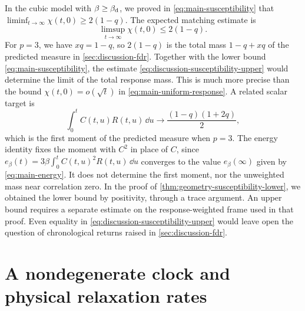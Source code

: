 In the cubic model with $\beta\ge\beta_{\mathrm d}$, we proved in \eqref{eq:main-susceptibility} that $\liminf_{t\to\infty}\chi(t,0)\ge2(1-q)$. The expected matching estimate is
\begin{equation}
 \limsup_{t\to\infty}\chi(t,0)\le2(1-q).
 \label{eq:discussion-susceptibility-upper}
\end{equation}
For $p=3$, we have $xq=1-q$, so $2(1-q)$ is the total mass $1-q+xq$ of the predicted measure in \cref{sec:discussion-fdr}. Together with the lower bound \eqref{eq:main-susceptibility}, the estimate \eqref{eq:discussion-susceptibility-upper} would determine the limit of the total response mass. This is much more precise than the bound $\chi(t,0)=o(\sqrt t)$ in \eqref{eq:main-uniform-response}. A related scalar target is
\[
 \int_0^t C(t,u)R(t,u)\,\dd u
          \longrightarrow\frac{(1-q)(1+2q)}2,
\]
which is the first moment of the predicted measure when $p=3$. The energy identity fixes the moment with $C^2$ in place of $C$, since $e_\beta(t)=3\beta\int_0^tC(t,u)^2R(t,u)\,\dd u$ converges to the value $e_\beta(\infty)$ given by \eqref{eq:main-energy}. It does not determine the first moment, nor the unweighted mass near correlation zero. In the proof of \cref{thm:geometry-susceptibility-lower}, we obtained the lower bound by positivity, through a trace argument. An upper bound requires a separate estimate on the response-weighted frame used in that proof. Even equality in \eqref{eq:discussion-susceptibility-upper} would leave open the question of chronological returns raised in \cref{sec:discussion-fdr}.

\section{A nondegenerate clock and physical relaxation rates}\label{sec:discussion-clock}

